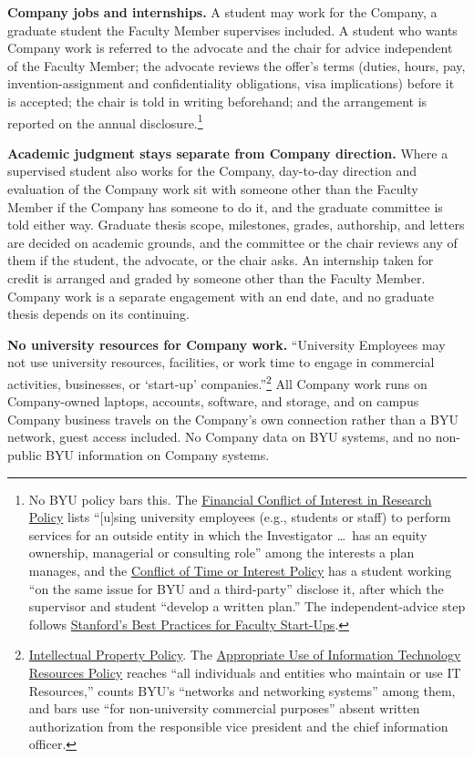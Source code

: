 \documentclass[11pt]{article}
\begin{document}
 \textbf{Company jobs and internships.} A student may work for the
Company, a graduate student the Faculty Member supervises included. A student
who wants Company work is referred to the advocate and the chair for advice
independent of the Faculty Member; the advocate reviews the offer's terms
(duties, hours, pay, invention-assignment and confidentiality obligations,
visa implications) before it is accepted; the chair is told in writing
beforehand; and the arrangement is reported on the annual
disclosure.\footnote{No BYU policy bars this. The
\href{https://policy.byu.edu/view/financial-conflict-of-interest-in-research-policy}{Financial
Conflict of Interest in Research Policy} lists ``[u]sing university employees
(e.g., students or staff) to perform services for an outside entity in which
the Investigator \ldots\ has an equity ownership, managerial or consulting
role'' among the interests a plan manages, and the
\href{https://policy.byu.edu/view/conflict-of-time-or-interest-policy}{Conflict
of Time or Interest Policy} has a student working ``on the same issue for BYU
and a third-party'' disclose it, after which the supervisor and student
``develop a written plan.'' The independent-advice step follows
\href{https://web.stanford.edu/group/OTL/documents/bp_faculty_sus.pdf}{Stanford's
Best Practices for Faculty Start-Ups}.}

 \textbf{Academic judgment stays separate from Company direction.}
Where a supervised student also works for the Company, day-to-day direction
and evaluation of the Company work sit with someone other than the Faculty
Member if the Company has someone to do it, and the graduate committee is told
either way.
Graduate thesis scope, milestones, grades, authorship, and letters are decided
on academic grounds, and the committee or the chair reviews any of them if the
student, the advocate, or the chair asks. An internship taken for credit is
arranged and graded by someone other than the Faculty Member. Company work is
a separate engagement with an end date, and no graduate thesis depends on its
continuing.


 \textbf{No university resources for Company work.} ``University
Employees may not use university resources, facilities, or work time to engage
in commercial activities, businesses, or `start-up'
companies.''\footnote{\href{https://policy.byu.edu/view/intellectual-property-policy}{Intellectual
Property Policy}. The \href{https://policy.byu.edu/view/appropriate-use-of-information-technology-resources-policy}{Appropriate
Use of Information Technology Resources Policy} reaches ``all individuals and
entities who maintain or use IT Resources,'' counts BYU's ``networks and
networking systems'' among them, and bars use ``for non-university commercial
purposes'' absent written authorization from the responsible vice president
and the chief information officer.} All Company work runs on Company-owned
laptops, accounts, software, and storage, and on campus Company business
travels on the Company's own connection rather than a BYU network, guest
access included. No Company data
on BYU systems, and no non-public BYU information on Company systems.
\end{document}
